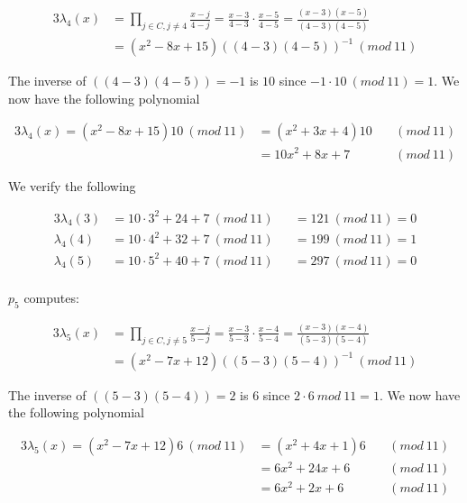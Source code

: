 \noindent
\begin{alignat*}{3}
 \lambda_4(x)&=\prod\limits_{j\in C,j\neq4} \frac{x-j}{4-j} = \frac{x-3}{4-3} \cdot \frac{x-5}{4-5} =\frac{(x-3)(x-5)}{(4-3)(4-5)}\\ 
 &= (x^2-8x+15)((4-3)(4-5))^{-1} \ (mod \ 11)
\end{alignat*}



\noindent
The inverse of  $((4-3)(4-5))= -1$ is $10$ since $-1 \cdot 10 \ (mod \ 11) = 1$. We now have the following polynomial


\noindent
\begin{alignat*}{3}
\lambda_4(x) = (x^2-8x+15)10 \ (mod \ 11) &= (x^2 + 3x+4)10 \ &&(mod \ 11) \\
                                          &= 10x^2 + 8x + 7 \ &&(mod \ 11) 
\end{alignat*}

\noindent
We verify the following

\noindent
\begin{alignat*}{3}
\lambda_4(3) &=  10 \cdot 3^2+24+ 7  \ (mod \ 11) &&= 121 \ (mod \ 11) = 0 \\
\lambda_4(4) &=  10 \cdot 4^2+32+ 7  \ (mod \ 11) &&= 199 \ (mod \ 11) = 1 \\
\lambda_4(5) &=  10 \cdot 5^2+40+ 7  \ (mod \ 11) &&= 297 \ (mod \ 11) = 0 \\
\end{alignat*}




\noindent
$p_5$ computes:

\noindent
\begin{alignat*}{3}
 \lambda_5(x)&=\prod\limits_{j\in C,j\neq5} \frac{x-j}{5-j} = \frac{x-3}{5-3} \cdot \frac{x-4}{5-4} =\frac{(x-3)(x-4)}{(5-3)(5-4)} \\
&= (x^2-7x+12)((5-3)(5-4))^{-1} \ (mod \ 11)
\end{alignat*}



\noindent
The inverse of  $((5-3)(5-4))= 2$ is $6$ since $2 \cdot 6 \ mod \ 11 = 1$. We now have the following polynomial

\noindent
\begin{alignat*}{3}
\lambda_5(x)= (x^2-7x+12)6 \ (mod \ 11) &= (x^2 + 4x+1)6 \ &&(mod \ 11) \\
                                        &= 6x^2 + 24x + 6 \ &&(mod \ 11) \\
                                        &= 6x^2 + 2x + 6 \ &&(mod \ 11)
\end{alignat*}

